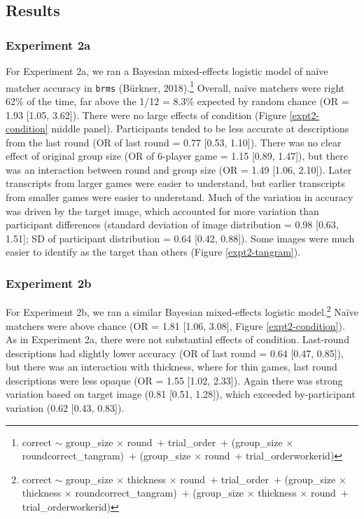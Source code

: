 \documentclass[10pt, letterpaper]{article}
\begin{document}
\subsection{Results}\label{results}

\subsubsection{Experiment 2a}\label{experiment-2a-1}

For Experiment 2a, we ran a Bayesian mixed-effects logistic model of
naïve matcher accuracy in \texttt{brms} (Bürkner, 2018).\footnote{correct
  \({\sim}\) group\_size \({\times}\) round~\({+}\) trial\_order~\({+}\)
  (group\_size \({\times}\) round\textbar correct\_tangram)~\({+}\)
  (group\_size \({\times}\) round~\({+}\) trial\_order\textbar workerid)}
Overall, naïve matchers were right 62\% of the time, far above the 1/12
= 8.3\% expected by random chance (OR = 1.93 {[}1.05, 3.62{]}). There
were no large effects of condition (Figure \ref{expt2-condition} middle
panel). Participants tended to be less accurate at descriptions from the
last round (OR of last round = 0.77 {[}0.53, 1.10{]}). There was no
clear effect of original group size (OR of 6-player game = 1.15 {[}0.89,
1.47{]}), but there was an interaction between round and group size (OR
= 1.49 {[}1.06, 2.10{]}). Later transcripts from larger games were
easier to understand, but earlier transcripts from smaller games were
easier to understand. Much of the variation in accuracy was driven by
the target image, which accounted for more variation than participant
differences (standard deviation of image distribution = 0.98 {[}0.63,
1.51{]}; SD of participant distribution = 0.64 {[}0.42, 0.88{]}). Some
images were much easier to identify as the target than others (Figure
\ref{expt2-tangram}).

\subsubsection{Experiment 2b}\label{experiment-2b-1}

For Experiment 2b, we ran a similar Bayesian mixed-effects logistic
model.\footnote{correct \({\sim}\) group\_size \({\times}\) thickness
  \({\times}\) round~\({+}\) trial\_order~\({+}\) (group\_size
  \({\times}\) thickness \({\times}\)
  round\textbar correct\_tangram)~\({+}\) (group\_size \({\times}\)
  thickness \({\times}\) round~\({+}\) trial\_order\textbar workerid)}
Naïve matchers were above chance (OR = 1.81 {[}1.06, 3.08{]}, Figure
\ref{expt2-condition}). As in Experiment 2a, there were not substantial
effects of condition. Last-round descriptions had slightly lower
accuracy (OR of last round = 0.64 {[}0.47, 0.85{]}), but there was an
interaction with thickness, where for thin games, last round
descriptions were less opaque (OR = 1.55 {[}1.02, 2.33{]}). Again there
was strong variation based on target image (0.81 {[}0.51, 1.28{]}),
which exceeded by-participant variation (0.62 {[}0.43, 0.83{]}).
\end{document}
